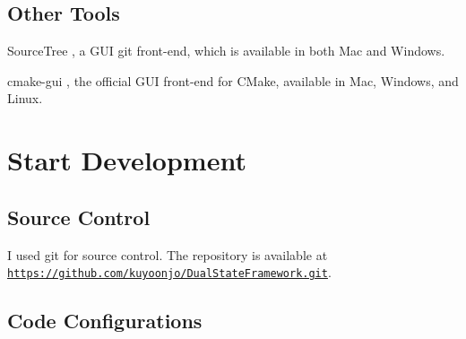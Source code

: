 \hypertarget{_conformanceto_specificationand_design_manual_SetupDevelopmentEnvironmentOtherTools}{}\subsection{Other Tools}\label{_conformanceto_specificationand_design_manual_SetupDevelopmentEnvironmentOtherTools}

\begin{DoxyItemize}
\item Source\+Tree \cite{sourcetree}, a G\+U\+I git front-\/end, which is available in both Mac and Windows.
\item cmake-\/gui \cite{cmakegui}, the official G\+U\+I front-\/end for C\+Make, available in Mac, Windows, and Linux.
\end{DoxyItemize}\hypertarget{_conformanceto_specificationand_design_manual_StartDevelopment}{}\section{Start Development}\label{_conformanceto_specificationand_design_manual_StartDevelopment}
\hypertarget{_conformanceto_specificationand_design_manual_StartDevelopmentSourceControl}{}\subsection{Source Control}\label{_conformanceto_specificationand_design_manual_StartDevelopmentSourceControl}
I used git for source control. The repository is available at \href{https://github.com/kuyoonjo/DualStateFramework.git}{\tt https\+://github.\+com/kuyoonjo/\+Dual\+State\+Framework.\+git}. \hypertarget{_conformanceto_specificationand_design_manual_StartDevelopmentCodeConfigurations}{}\subsection{Code Configurations}\label{_conformanceto_specificationand_design_manual_StartDevelopmentCodeConfigurations}
